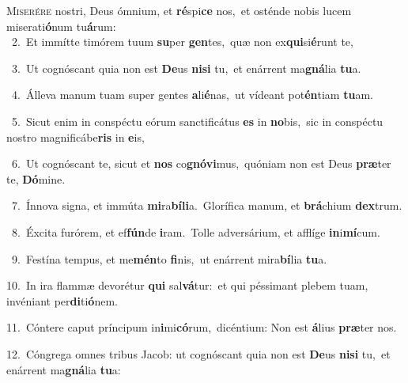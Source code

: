 \lettrine{\initial\textcolor{\initialcolor}{M}}{iserére} nostri, Deus ómnium, et \textbf{ré}\-spi\textbf{ce} nos,~\star et osténde nobis lucem miserati\-\textbf{ó}\-num tu\-\textbf{á}\-rum:\\
{\numbfont\textcolor{\numbcolor}{~2.}}~Et immítte timórem tuum \textbf{su}\-per \textbf{gen}\-tes,~\star quæ non ex\-\textbf{qui}\-si\-\textbf{é}\-runt te,\par
{\numbfont\textcolor{\numbcolor}{~3.}}~Ut cognóscant quia non est \textbf{De}\-us \textbf{ni}\-\textbf{si} tu,~\star et enárrent ma\-\textbf{gná}\-lia \textbf{tu}\-a.\par
{\numbfont\textcolor{\numbcolor}{~4.}}~Álleva manum tuam super gentes \textbf{a}\-li\-\textbf{é}\-nas,~\star ut vídeant pot\-\textbf{én}\-tiam \textbf{tu}\-am.\par
{\numbfont\textcolor{\numbcolor}{~5.}}~Sicut enim in conspéctu eórum sanctificátus \textbf{es} in \textbf{no}\-bis,~\star sic in conspéctu nostro magnificábe\textbf{ris} in \textbf{e}\-is,\par
{\numbfont\textcolor{\numbcolor}{~6.}}~Ut cognóscant te, sicut et \textbf{nos} co\-\textbf{gnó}\-\textbf{vi}mus,~\star quóniam non est Deus \textbf{præ}\-ter te, \textbf{Dó}\-mine.\par
{\numbfont\textcolor{\numbcolor}{~7.}}~Ínnova signa, et immúta \textbf{mi}\-ra\-\textbf{bí}\-\textbf{li}a.~\star Glorífica manum, et \textbf{brá}\-chium \textbf{dex}\-trum.\par
{\numbfont\textcolor{\numbcolor}{~8.}}~Éxcita furórem, et ef\-\textbf{fún}\-de \textbf{i}\-ram.~\star Tolle adversárium, et afflíge \textbf{in}\-i\-\textbf{mí}\-cum.\par
{\numbfont\textcolor{\numbcolor}{~9.}}~Festína tempus, et me\-\textbf{mén}\-to \textbf{fi}\-nis,~\star ut enárrent mira\-\textbf{bí}\-lia \textbf{tu}\-a.\par
{\numbfont\textcolor{\numbcolor}{10.}}~In ira flammæ devorétur \textbf{qui} sal\-\textbf{vá}\-tur:~\star et qui péssimant plebem tuam, invéniant per\-\textbf{di}\-ti\-\textbf{ó}\-nem.\par
{\numbfont\textcolor{\numbcolor}{11.}}~Cóntere caput príncipum in\-\textbf{i}\-mi\-\textbf{có}\-rum,~\star dicéntium: Non est \textbf{á}\-lius \textbf{præ}\-ter nos.\par
{\numbfont\textcolor{\numbcolor}{12.}}~Cóngrega omnes tribus Jacob: ut cognóscant quia non est \textbf{De}\-us \textbf{ni}\-\textbf{si} tu,~\star et enárrent ma\-\textbf{gná}\-lia \textbf{tu}\-a:\par
